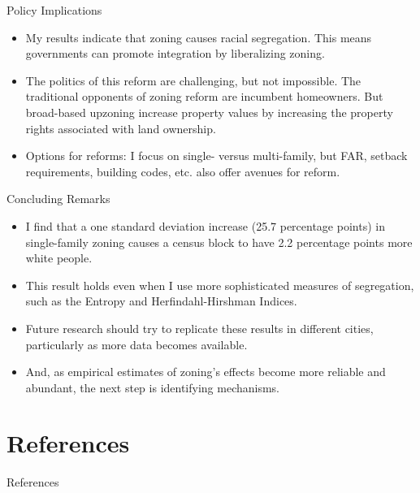 \documentclass{beamer}
\begin{document}
\begin{frame}{Policy Implications}
    \begin{itemize}
        \item My results indicate that zoning causes racial segregation. This means governments can promote integration by liberalizing zoning. 

        \item The politics of this reform are challenging, but not impossible. The traditional opponents of zoning reform are incumbent homeowners. But broad-based upzoning increase property values by increasing the property rights associated with land ownership.

        \item Options for reforms: I focus on single- versus multi-family, but FAR, setback requirements, building codes, etc. also offer avenues for reform.
    \end{itemize}  
\end{frame}

\begin{frame}{Concluding Remarks}
    \begin{itemize}
        \item I find that a one standard deviation increase (25.7 percentage points) in single-family zoning causes a census block to have 2.2 percentage points more white people.
        
        \item This result holds even when I use more sophisticated measures of segregation, such as the Entropy and Herfindahl-Hirshman Indices.

        \item Future research should try to replicate these results in different cities, particularly as more data becomes available.

        \item And, as empirical estimates of zoning's effects become more reliable and abundant, the next step is identifying mechanisms.
    \end{itemize}
\end{frame}

\section*{References}

\begin{frame}[allowframebreaks]{References}
\footnotesize
    \nocite{*}
\printbibliography[heading=none]
\end{frame}
\end{document}
